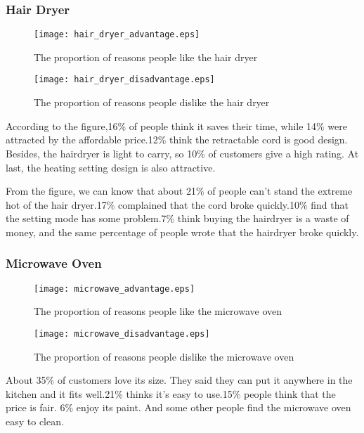 \documentclass{mcmthesis}
\begin{document}
	
	\subsubsection{Hair Dryer}
	\begin{figure}[H]
		\begin{minipage}[t]{0.5\textwidth}
			\centering
			\texttt{[image: hair\_dryer\_advantage.eps]}
			\caption{The proportion of reasons people like the hair dryer}
		\end{minipage}
		\qquad
		\begin{minipage}[t]{0.5\textwidth}
			\centering
			\texttt{[image: hair\_dryer\_disadvantage.eps]}
			\caption{The proportion of reasons people dislike the hair dryer }
		\end{minipage}
	\end{figure}
	
	According to the figure,16\% of people think it saves their time, while 14\% were attracted by the affordable price.12\% think the retractable cord is good design. Besides, the hairdryer is light to carry, so 10\% of customers give a high rating. At last, the heating setting design is also attractive.
	
	From the figure, we can know that about 21\% of people can't stand the extreme hot of the hair dryer.17\% complained that the cord broke quickly.10\% find that the setting mode has some problem.7\% think buying the hairdryer is a waste of money, and the same percentage of people wrote that the hairdryer broke quickly.
	
	\subsubsection{Microwave Oven}
	\begin{figure}[H]
		\begin{minipage}[t]{0.5\textwidth}
			\centering
			\texttt{[image: microwave\_advantage.eps]}
			\caption{The proportion of reasons people like the microwave oven\label{fig:1}}
		\end{minipage}
		\qquad
		\begin{minipage}[t]{0.5\textwidth}
			\centering
			\texttt{[image: microwave\_disadvantage.eps]}
			\caption{The proportion of reasons people dislike the microwave oven\label{fig:2}}
		\end{minipage}
	\end{figure}
	
	About 35\% of customers love its size. They said they can put it anywhere in the kitchen and it fits well.21\% thinks it's easy to use.15\% people think that the price is fair.	6\% enjoy its paint. And some other people find the microwave oven easy to clean.
	
\end{document}
